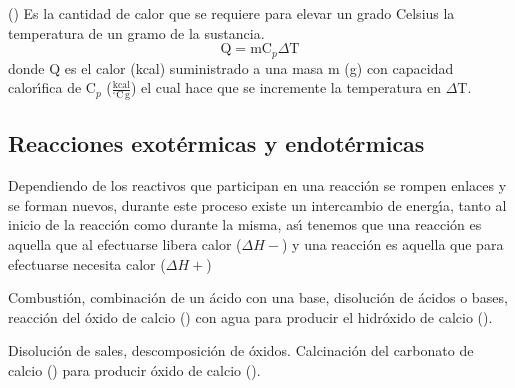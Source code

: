 \noindent\textbf{} () Es la cantidad de calor que se requiere para elevar un grado Celsius la temperatura de un gramo de la sustancia.
\begin{equation}
\textrm{Q} =\textrm{m} \textrm{C}_p \Delta \textrm{T}
\end{equation}
 donde
Q es el calor  (kcal) suministrado a una masa m (g) con capacidad calor\'{\i}fica de C$_p$ ($\frac{\textrm{kcal}}{^\circ \textrm{C}\,\textrm{g}}$) el cual hace que se incremente la temperatura en $\Delta$T.

\subsection{Reacciones exot\'ermicas y endot\'ermicas}

Dependiendo de los reactivos que participan en una reacci\'on se rompen enlaces y se forman nuevos, durante este proceso existe un intercambio de energ\'{\i}a, tanto al inicio de la reacci\'on como durante la misma, as\'{\i} tenemos que una reacci\'on  es aquella que al efectuarse libera calor ($\Delta H -$)
 y una reacci\'on  es aquella que para efectuarse necesita calor ($\Delta H +$) 

\begin{example} 
Combusti\'on, combinaci\'on de un \'acido con una base, disoluci\'on de \'acidos o bases, reacci\'on del \'oxido de calcio () con agua para producir el hidr\'oxido de calcio ().
\end{example}
\begin{example}
 Disoluci\'on de sales, descomposici\'on de \'oxidos. Calcinaci\'on del carbonato de calcio () para producir \'oxido de calcio ().
\end{example}

